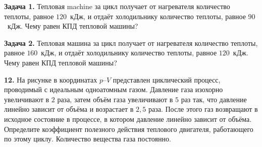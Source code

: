 \begin{taskbasic}[code={\label{task:mkt_eff_v27_n8}}]
\textbf{Задача 1.} Тепловая machine за цикл получает от нагревателя количество теплоты, равное $120$~кДж, и отдаёт холодильнику количество теплоты, равное $90$~кДж. Чему равен КПД тепловой машины?

\end{taskbasic}

\begin{taskbasic}[code={\label{task:mkt_eff_v28_n8}}]
\textbf{Задача 2.} Тепловая машина за цикл получает от нагревателя количество теплоты, равное $160$~кДж, и отдаёт холодильнику количество теплоты, равное $120$~кДж. Чему равен КПД тепловой машины?

\end{taskbasic}

\begin{taskbasic}
    \textbf{12.} На рисунке в координатах $p$--$V$ представлен циклический процесс, проводимый с идеальным одноатомным газом. Давление газа изохорно увеличивают в $2$ раза, затем объём газа увеличивают в $5$ раз так, что давление линейно зависит от объёма и возрастает в $2{,}5$ раза. После этого газ возвращают в исходное состояние в процессе, в котором давление линейно зависит от объёма. Определите коэффициент полезного действия теплового двигателя, работающего по этому циклу. Количество вещества газа постоянно.
\begin{center}
\end{center}
\end{taskbasic}

